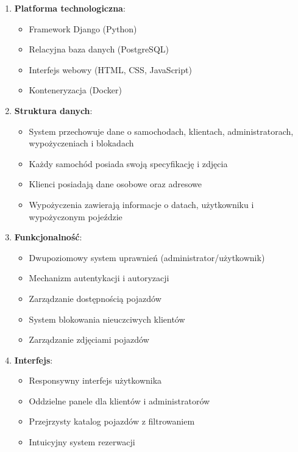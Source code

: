 \documentclass[12pt,a4paper]{article}
\begin{document}
\begin{enumerate}
    \item \textbf{Platforma technologiczna}:
    \begin{itemize}
        \item Framework Django (Python)
        \item Relacyjna baza danych (PostgreSQL)
        \item Interfejs webowy (HTML, CSS, JavaScript)
        \item Konteneryzacja (Docker)
    \end{itemize}
    
    \item \textbf{Struktura danych}:
    \begin{itemize}
        \item System przechowuje dane o samochodach, klientach, administratorach, wypożyczeniach i blokadach
        \item Każdy samochód posiada swoją specyfikację i zdjęcia
        \item Klienci posiadają dane osobowe oraz adresowe
        \item Wypożyczenia zawierają informacje o datach, użytkowniku i wypożyczonym pojeździe
    \end{itemize}
    
    \item \textbf{Funkcjonalność}:
    \begin{itemize}
        \item Dwupoziomowy system uprawnień (administrator/użytkownik)
        \item Mechanizm autentykacji i autoryzacji
        \item Zarządzanie dostępnością pojazdów
        \item System blokowania nieuczciwych klientów
        \item Zarządzanie zdjęciami pojazdów
    \end{itemize}
    
    \item \textbf{Interfejs}:
    \begin{itemize}
        \item Responsywny interfejs użytkownika
        \item Oddzielne panele dla klientów i administratorów
        \item Przejrzysty katalog pojazdów z filtrowaniem
        \item Intuicyjny system rezerwacji
    \end{itemize}
\end{enumerate}
\end{document}
